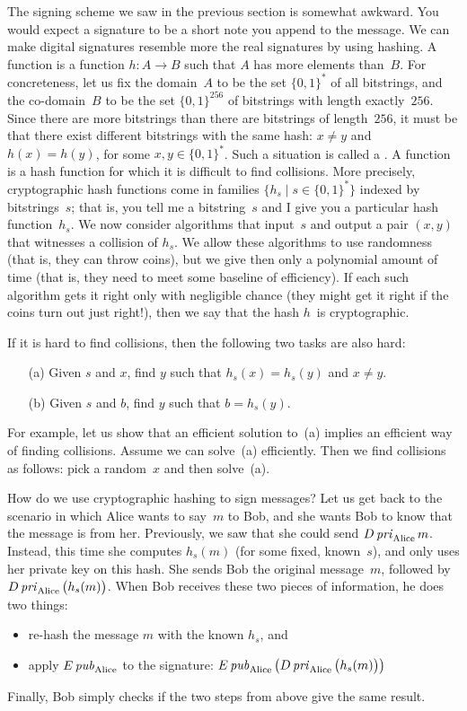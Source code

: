 The signing scheme we saw in the previous section is somewhat awkward.
You would expect a signature to be a short note you append to the message.
We can make digital signatures resemble more the real signatures by using hashing.
A  function is a function $h:A\to B$ such that $A$ has more elements than~$B$.
For concreteness, let us fix the domain~$A$ to be the set $\{0,1\}^*$ of all bitstrings, and the co-domain~$B$ to be the set $\{0,1\}^{256}$ of bitstrings with length exactly~$256$.
Since there are more bitstrings than there are bitstrings of length~$256$, it must be that there exist different bitstrings with the same hash: $x\ne y$ and $h(x)=h(y)$, for some $x,y\in\{0,1\}^*$.
Such a situation is called a .
A  function is a hash function for which it is difficult to find collisions.
More precisely, cryptographic hash functions come in families $\bigl\{h_s \mid s\in\{0,1\}^*\bigr\}$ indexed by bitstrings~$s$; that is, you tell me a bitstring~$s$ and I give you a particular hash function~$h_s$.
We now consider algorithms that input~$s$ and output a pair $(x,y)$ that witnesses a collision of $h_s$.
We allow these algorithms to use randomness (that is, they can throw coins), but we give then only a polynomial amount of time (that is, they need to meet some baseline of efficiency).
If each such algorithm gets it right only with negligible chance (they might get it right if the coins turn out just right!), then we say that the hash $h$~is cryptographic.

If it is hard to find collisions, then the following two tasks are also hard:
\begin{enumerate}
\item[(a)] Given $s$ and $x$, find $y$ such that $h_s(x)=h_s(y)$ and $x\ne y$.
\item[(b)] Given $s$ and $b$, find $y$ such that $b=h_s(y)$.
\end{enumerate}
For example, let us show that an efficient solution to~(a) implies an efficient way of finding collisions.
Assume we can solve~(a) efficiently.
Then we find collisions as follows: pick a random~$x$ and then solve~(a).

\medskip

How do we use cryptographic hashing to sign messages?
Let us get back to the scenario in which Alice wants to say~$m$ to Bob, and she wants Bob to know that the message is from her.
Previously, we saw that she could send $D\,{\it pri}_{\rm Alice}\,m$.
Instead, this time she computes $h_s(m)$ (for some fixed, known~$s$), and only uses her private key on this hash.
She sends Bob the original message~$m$, followed by $D\,{\it pri}_{\rm Alice}\,\bigl(h_s(m)\bigr)$.
When Bob receives these two pieces of information, he does two things:
\begin{itemize}
\item re-hash the message $m$ with the known $h_s$, and
\item apply $E\,{\it pub}_{\rm Alice}$ to the signature:
  $E\,{\it pub}_{\rm Alice}\,\bigl(D\,{\it pri}_{\rm Alice}\,\bigl(h_s(m)\bigr)\bigr)$
\end{itemize}
Finally, Bob simply checks if the two steps from above give the same result.


